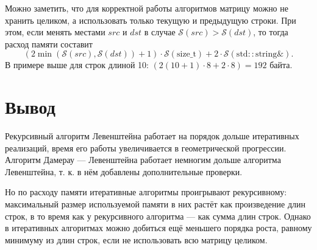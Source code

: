 Можно заметить, что для корректной работы алгоритмов матрицу можно не хранить целиком, а использовать только текущую и предыдущую строки. При этом, если менять местами $src$ и $dst$ в случае $\mathcal{S}(src) > \mathcal{S}(dst)$, то тогда расход памяти составит
\begin{equation}
(2\min(\mathcal{S}(src), \mathcal{S}(dst)) + 1) \cdot \mathcal{S}\mathrm{(size\_t)} + 2\cdot\mathcal{S}\mathrm{(std\!::\!string\&)}.
\end{equation}
В примере выше для строк длиной 10: $(2(10 + 1)\cdot8 + 2\cdot8) = 192$ байта.

\section*{Вывод}

Рекурсивный алгоритм Левенштейна работает на порядок дольше итеративных реализаций, время его работы увеличивается в геометрической прогрессии. Алгоритм Дамерау — Левенштейна работает немногим дольше алгоритма Левенштейна, т. к. в нём добавлены дополнительные проверки.

Но по расходу памяти итеративные алгоритмы проигрывают рекурсивному: максимальный размер используемой памяти в них растёт как произведение длин строк, в то время как у рекурсивного алгоритма — как сумма длин строк. Однако в итеративных алгоритмах можно добиться ещё меньшего порядка роста, равному минимуму из длин строк, если не использовать всю матрицу целиком.
